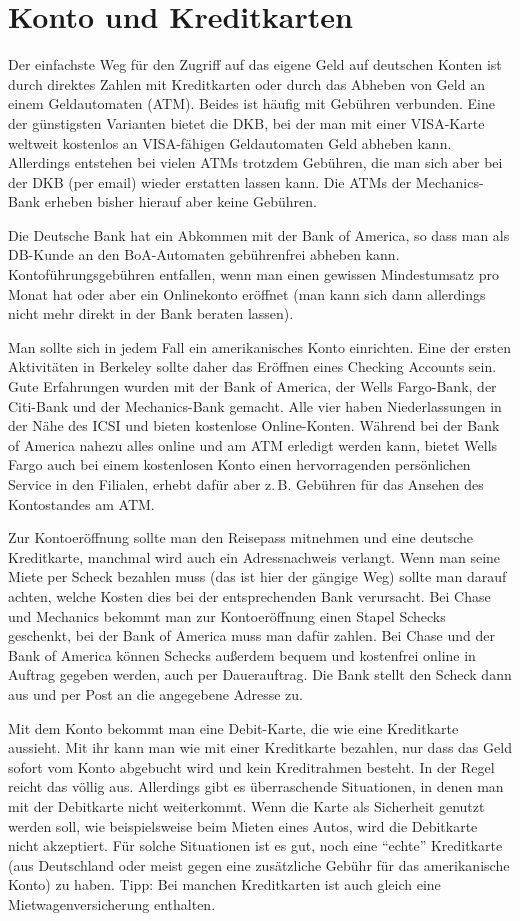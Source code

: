 \documentclass[a4paper]{scrreprt}
\begin{document}
\section{Konto und Kreditkarten}

Der einfachste Weg für den Zugriff auf das eigene Geld auf deutschen Konten ist durch direktes Zahlen mit Kreditkarten oder durch das Abheben von Geld an einem Geldautomaten (ATM). Beides ist häufig mit Gebühren verbunden. Eine der günstigsten Varianten bietet die DKB, bei der man mit einer VISA-Karte weltweit kostenlos an VISA-fähigen Geldautomaten Geld abheben kann. Allerdings entstehen bei vielen ATMs trotzdem Gebühren, die man sich aber bei der DKB (per email) wieder erstatten lassen kann. Die ATMs der Mechanics-Bank erheben bisher hierauf aber keine Gebühren.

Die Deutsche Bank hat ein Abkommen mit der Bank of America, so dass man als DB-Kunde an den BoA-Automaten gebührenfrei abheben kann. Kontoführungsgebühren entfallen, wenn man einen gewissen Mindestumsatz pro Monat hat oder aber ein Onlinekonto eröffnet (man kann sich dann allerdings nicht mehr direkt in der Bank beraten lassen).

Man sollte sich in jedem Fall ein amerikanisches Konto einrichten. Eine der ersten Aktivitäten in Berkeley sollte daher das Eröffnen eines Checking Accounts sein. Gute Erfahrungen wurden mit der Bank of America, der Wells Fargo-Bank, der Citi-Bank und der Mechanics-Bank gemacht. Alle vier haben Niederlassungen in der Nähe des ICSI und bieten kostenlose Online-Konten. Während bei der Bank of America nahezu alles online und am ATM erledigt werden kann, bietet Wells Fargo auch bei einem kostenlosen Konto einen hervorragenden persönlichen Service in den Filialen, erhebt dafür aber z.\,B. Gebühren für das Ansehen des Kontostandes am ATM.


Zur Kontoeröffnung sollte man den Reisepass mitnehmen und eine deutsche Kreditkarte, manchmal wird auch ein Adressnachweis verlangt. Wenn man seine Miete per Scheck bezahlen muss (das ist hier der gängige Weg) sollte man darauf achten, welche Kosten dies bei der entsprechenden Bank verursacht. Bei Chase und Mechanics bekommt man zur Kontoeröffnung einen Stapel Schecks geschenkt, bei der Bank of America muss man dafür zahlen. Bei Chase und der Bank of America können Schecks außerdem bequem und kostenfrei online in Auftrag gegeben werden, auch per Dauerauftrag. Die Bank stellt den Scheck dann aus und per Post an die angegebene Adresse zu.

Mit dem Konto bekommt man eine Debit-Karte, die wie eine Kreditkarte aussieht. Mit ihr kann man wie mit einer Kreditkarte bezahlen, nur dass das Geld sofort vom Konto abgebucht wird und kein Kreditrahmen besteht. In der Regel reicht das völlig aus. Allerdings gibt es überraschende Situationen, in denen man mit der Debitkarte nicht weiterkommt. Wenn die Karte als Sicherheit genutzt werden soll, wie beispielsweise beim Mieten eines Autos, wird die Debitkarte nicht akzeptiert. Für solche Situationen ist es gut, noch eine "`echte"' Kreditkarte (aus Deutschland oder meist gegen eine zusätzliche Gebühr für das amerikanische Konto) zu haben. Tipp: Bei manchen Kreditkarten ist auch gleich eine Mietwagenversicherung enthalten.
\end{document}
